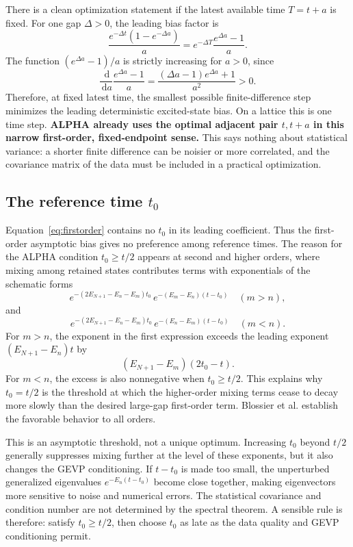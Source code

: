 \documentclass[11pt]{article}
\newcommand{\dd}{\,\mathrm d}
\begin{document}
There is a clean optimization statement if the latest available time $T=t+a$ is fixed. For one gap $\Delta>0$, the leading bias factor is
\[
\frac{e^{-\Delta t}(1-e^{-\Delta a})}{a}
=e^{-\Delta T}\frac{e^{\Delta a}-1}{a}.
\]
The function $(e^{\Delta a}-1)/a$ is strictly increasing for $a>0$, since
\[
\frac{\dd}{\dd a}\frac{e^{\Delta a}-1}{a}
=\frac{(\Delta a-1)e^{\Delta a}+1}{a^2}>0.
\]
Therefore, at fixed latest time, the smallest possible finite-difference step minimizes the leading deterministic excited-state bias. On a lattice this is one time step. \textbf{ALPHA already uses the optimal adjacent pair $t,t+a$ in this narrow first-order, fixed-endpoint sense.} This says nothing about statistical variance: a shorter finite difference can be noisier or more correlated, and the covariance matrix of the data must be included in a practical optimization.

\subsection{The reference time $t_0$}
Equation~\eqref{eq:firstorder} contains no $t_0$ in its leading coefficient. Thus the first-order asymptotic bias gives no preference among reference times. The reason for the ALPHA condition $t_0\geq t/2$ appears at second and higher orders, where mixing among retained states contributes terms with exponentials of the schematic forms
\[
 e^{-(2E_{N+1}-E_n-E_m)t_0}\,e^{-(E_m-E_n)(t-t_0)}
 \quad(m>n),
\]
and
\[
 e^{-(2E_{N+1}-E_n-E_m)t_0}\,e^{-(E_n-E_m)(t-t_0)}
 \quad(m<n).
\]
For $m>n$, the exponent in the first expression exceeds the leading exponent $(E_{N+1}-E_n)t$ by
\[
(E_{N+1}-E_m)(2t_0-t).
\]
For $m<n$, the excess is also nonnegative when $t_0\geq t/2$. This explains why $t_0=t/2$ is the threshold at which the higher-order mixing terms cease to decay more slowly than the desired large-gap first-order term. Blossier et al. establish the favorable behavior to all orders.

This is an asymptotic threshold, not a unique optimum. Increasing $t_0$ beyond $t/2$ generally suppresses mixing further at the level of these exponents, but it also changes the GEVP conditioning. If $t-t_0$ is made too small, the unperturbed generalized eigenvalues $e^{-E_n(t-t_0)}$ become close together, making eigenvectors more sensitive to noise and numerical errors. The statistical covariance and condition number are not determined by the spectral theorem. A sensible rule is therefore: satisfy $t_0\geq t/2$, then choose $t_0$ as late as the data quality and GEVP conditioning permit.
\end{document}
